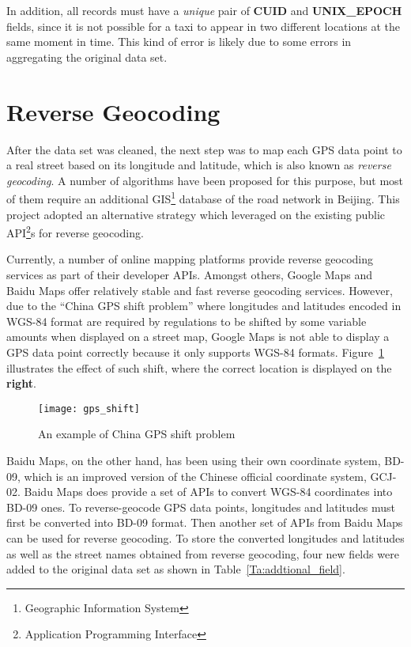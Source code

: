 In addition, all records must have a \emph{unique} pair of \textbf{CUID} and \textbf{UNIX\_EPOCH} fields, since it is not possible for a taxi to appear in two different locations at the same moment in time. This kind of error is likely due to some errors in aggregating the original data set.

\section{Reverse Geocoding}
After the data set was cleaned, the next step was to map each GPS data point to a real street based on its longitude and latitude, which is also known as \emph{reverse geocoding}. A number of algorithms \cite{MAP09} have been proposed for this purpose, but most of them require an additional GIS\footnote{Geographic Information System} database of the road network in Beijing. This project adopted an alternative strategy which leveraged on the existing public API\footnote{Application Programming Interface}s for reverse geocoding. 

Currently, a number of online mapping platforms provide reverse geocoding services as part of their developer APIs. Amongst others, Google Maps and Baidu Maps offer relatively stable and fast reverse geocoding services. However, due to the ``China GPS shift problem'' \cite{GSHF17} where longitudes and latitudes encoded in WGS-84 format are required by regulations to be shifted by some variable amounts when displayed on a street map, Google Maps is not able to display a GPS data point correctly because it only supports WGS-84 formats. Figure~\ref{Fig:gps_shift} illustrates the effect of such shift, where the correct location is displayed on the \textbf{right}. 

\begin{figure}[h!]
\texttt{[image: gps\_shift]}
\centering
\caption{An example of China GPS shift problem}\label{Fig:gps_shift}
\end{figure}

Baidu Maps, on the other hand, has been using their own coordinate system, BD-09, which is an improved version of the Chinese official coordinate system, GCJ-02. Baidu Maps does provide a set of APIs to convert WGS-84 coordinates into BD-09 ones. To reverse-geocode GPS data points, longitudes and latitudes must first be converted into BD-09 format. Then another set of APIs from Baidu Maps can be used for reverse geocoding. To store the converted longitudes and latitudes as well as the street names obtained from reverse geocoding, four new fields were added to the original data set as shown in Table~\ref{Ta:addtional_field}.

